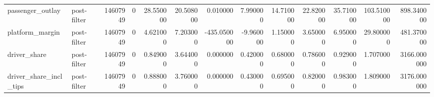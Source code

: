 \begin{longtable}{llrrrrrrrrrrr}
passenger_outlay & post-filter & 14607949 & 0 & 28.550000 & 20.508000 & 0.010000 & 7.990000 & 14.710000 & 22.820000 & 35.710000 & 103.510000 & 898.340000 \\
platform_margin & post-filter & 14607949 & 0 & 4.621000 & 7.203000 & -435.050000 & -9.960000 & 1.150000 & 3.650000 & 6.950000 & 29.800000 & 481.370000 \\
driver_share & post-filter & 14607949 & 0 & 0.849000 & 3.644000 & 0.000000 & 0.420000 & 0.680000 & 0.786000 & 0.929000 & 1.707000 & 3166.000000 \\
driver_share_incl_tips & post-filter & 14607949 & 0 & 0.888000 & 3.760000 & 0.000000 & 0.430000 & 0.695000 & 0.820000 & 0.983000 & 1.809000 & 3176.000000 \\
\end{longtable}

